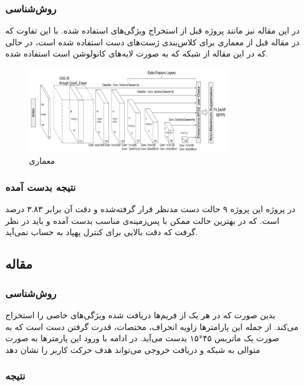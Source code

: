 \subsubsection{روش‌شناسی}
در این مقاله نیز مانند پروژه قبل از استخراج ویژگی‌های  استفاده شده. با این تفاوت که در مقاله قبل از معماری  برای کلاس‌بندی ژست‌های دست استفاده شده است، در حالی که در این مقاله از شبکه  که به صورت لایه‌های کانولوشن است استفاده شده.

\begin{figure}[h]
    \centering
    \includegraphics[width=0.8\textwidth]{VGG16.png}
    \caption{معماری }
\end{figure}


\subsubsection{نتیجه بدست آمده}
 در پروژه این پروژه ۹ حالت دست مدنظر قرار گرفته‌شده و دقت آن برابر ۳.۸۳ درصد است.
 که در بهترین حالت ممکن با پس‌زمینه‌ی مناسب بدست آمده و باید در نظر گرفت که دقت بالایی برای کنترل پهپاد به حساب نمی‌آید.



\subsection{مقاله }

\subsubsection{روش‌شناسی}
بدین صورت که در هر یک از فریم‌ها دریافت شده ویژگی‌های خاصی را استخراج می‌کند. از جمله این پارامترها زاویه انحراف، مختصات، قدرت گرفتن دست است که به صورت یک ماتریس ۴۵*۱۵ بدست می‌آید. در ادامه با ورود این پارمتر‌ها به صورت متوالی به شبکه و دریافت خروجی می‌تواند هدف حرکت کاربر را نشان دهد
\subsubsection{نتیجه}

